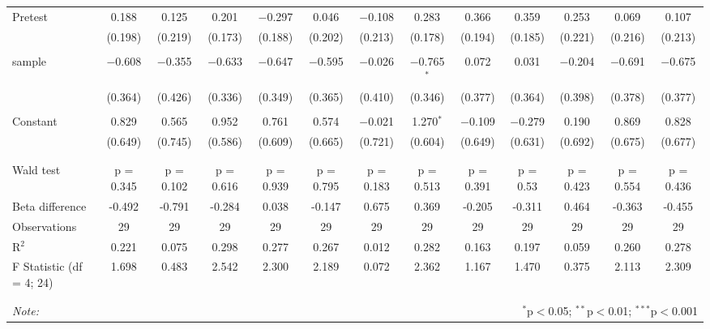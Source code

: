 \begin{table}[!htbp]
\begin{tabular}{@{\extracolsep{5pt}}lcccccccccccc}
 Pretest & 0.188 & 0.125 & 0.201 & $-$0.297 & 0.046 & $-$0.108 & 0.283 & 0.366 & 0.359 & 0.253 & 0.069 & 0.107 \\ 
  & (0.198) & (0.219) & (0.173) & (0.188) & (0.202) & (0.213) & (0.178) & (0.194) & (0.185) & (0.221) & (0.216) & (0.213) \\ 
  & & & & & & & & & & & & \\ 
 sample & $-$0.608 & $-$0.355 & $-$0.633 & $-$0.647 & $-$0.595 & $-$0.026 & $-$0.765$^{*}$ & 0.072 & 0.031 & $-$0.204 & $-$0.691 & $-$0.675 \\ 
  & (0.364) & (0.426) & (0.336) & (0.349) & (0.365) & (0.410) & (0.346) & (0.377) & (0.364) & (0.398) & (0.378) & (0.377) \\ 
  & & & & & & & & & & & & \\ 
 Constant & 0.829 & 0.565 & 0.952 & 0.761 & 0.574 & $-$0.021 & 1.270$^{*}$ & $-$0.109 & $-$0.279 & 0.190 & 0.869 & 0.828 \\ 
  & (0.649) & (0.745) & (0.586) & (0.609) & (0.665) & (0.721) & (0.604) & (0.649) & (0.631) & (0.692) & (0.675) & (0.677) \\ 
  & & & & & & & & & & & & \\ 
\cline{2-13} \\[-2.0ex]
Wald test & p = 0.345 & p = 0.102 & p = 0.616 & p = 0.939 & p = 0.795 & p = 0.183 & p = 0.513 & p = 0.391 & p = 0.53 & p = 0.423 & p = 0.554 & p = 0.436 \\ 
Beta difference & -0.492 & -0.791 & -0.284 & 0.038 & -0.147 & 0.675 & 0.369 & -0.205 & -0.311 & 0.464 & -0.363 & -0.455 \\ 
Observations & 29 & 29 & 29 & 29 & 29 & 29 & 29 & 29 & 29 & 29 & 29 & 29 \\ 
R$^{2}$ & 0.221 & 0.075 & 0.298 & 0.277 & 0.267 & 0.012 & 0.282 & 0.163 & 0.197 & 0.059 & 0.260 & 0.278 \\ 
F Statistic (df = 4; 24) & 1.698 & 0.483 & 2.542 & 2.300 & 2.189 & 0.072 & 2.362 & 1.167 & 1.470 & 0.375 & 2.113 & 2.309 \\ 
\\[-2.0ex]
\hline 
\hline \\[-1.8ex] 
\textit{Note:}  & \multicolumn{12}{r}{$^{*}$p$<$0.05; $^{**}$p$<$0.01; $^{***}$p$<$0.001} \\ 
\end{tabular} 
\end{table} 
